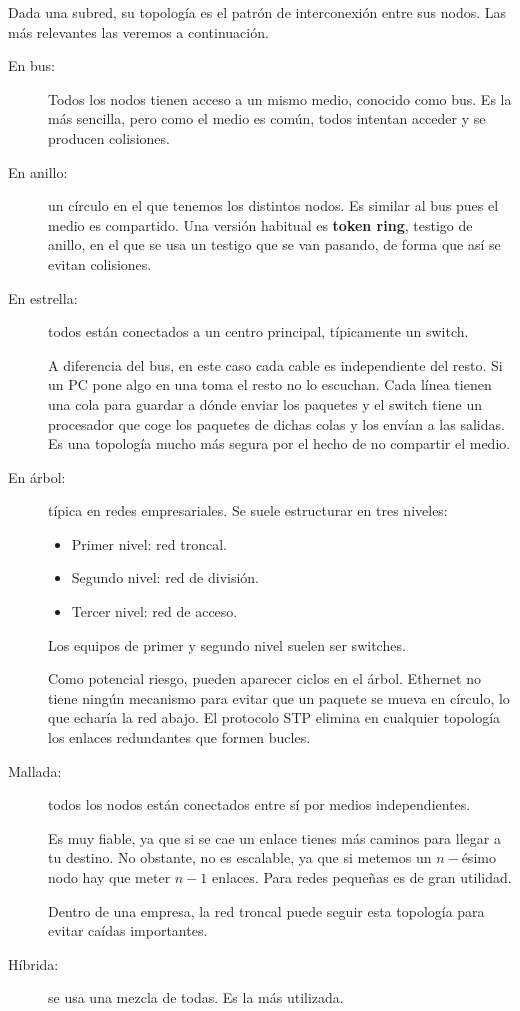 Dada una subred, su topología es el patrón de interconexión entre sus nodos. Las más relevantes las veremos a continuación.
\begin{description}
    \item[En bus:] Todos los nodos tienen acceso a un mismo medio, conocido como bus. Es la más sencilla, pero como el medio es común, todos intentan acceder y se producen colisiones. 
    \item[En anillo:] un círculo en el que tenemos los distintos nodos. Es similar al bus pues el medio es compartido. Una versión habitual es \textbf{token ring}, testigo de anillo, en el que se usa un testigo que se van pasando, de forma que así se evitan colisiones. 
    \item[En estrella:] todos están conectados a un centro principal, típicamente un switch. 

    A diferencia del bus, en este caso cada cable es independiente del resto. Si un PC pone algo en una toma el resto no lo escuchan. Cada línea tienen una cola para guardar a dónde enviar los paquetes y el switch tiene un procesador que coge los paquetes de dichas colas y los envían a las salidas. Es una topología mucho más segura por el hecho de no compartir el medio. 

    \item[En árbol:] típica en redes empresariales. Se suele estructurar en tres niveles:
    \begin{itemize}
        \item Primer nivel: red troncal.
        \item Segundo nivel: red de división.
        \item Tercer nivel: red de acceso. 
    \end{itemize}
    Los equipos de primer y segundo nivel suelen ser switches.
    
    Como potencial riesgo, pueden aparecer ciclos en el árbol. Ethernet no tiene ningún mecanismo para evitar que un paquete se mueva en círculo, lo que echaría la red abajo. El protocolo \acrfull{STP} elimina en cualquier topología los enlaces redundantes que formen bucles.

    \item[Mallada:] todos los nodos están conectados entre sí por medios independientes.
    
    Es muy fiable, ya que si se cae un enlace tienes más caminos para llegar a tu destino. No obstante, no es escalable, ya que si metemos un $n-$ésimo nodo hay que meter $n-1$ enlaces. Para redes pequeñas es de gran utilidad.

    Dentro de una empresa, la red troncal puede seguir esta topología para evitar caídas importantes. 

    \item[Híbrida:] se usa una mezcla de todas. Es la más utilizada.   
\end{description}


